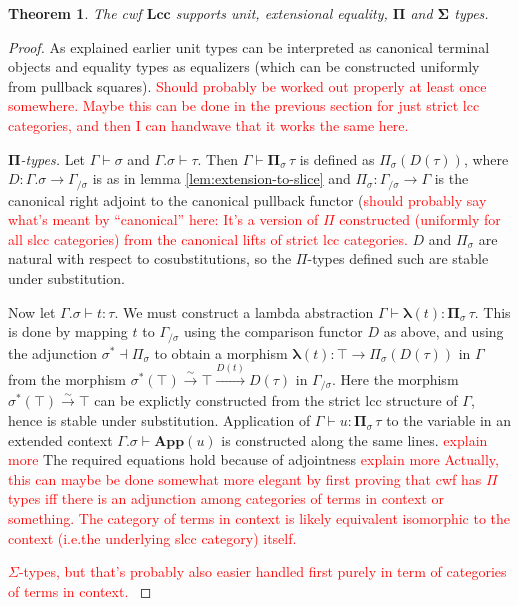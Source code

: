\documentclass{article}
\newcommand{\todo}[1]{\textcolor{red}{#1}}
\newtheorem{theorem}{Theorem}
\begin{document}
\begin{theorem}
  \label{th:lcc-supports-types}
  The cwf $\mathbf{Lcc}$ supports unit, extensional equality, $\mathbf{\Pi}$ and $\mathbf{\Sigma}$ types.
\end{theorem}
\begin{proof}
  As explained earlier unit types can be interpreted as canonical terminal objects and equality types as equalizers (which can be constructed uniformly from pullback squares).
  \todo{
    Should probably be worked out properly at least once somewhere.
    Maybe this can be done in the previous section for just strict lcc categories, and then I can handwave that it works the same here.
  }

  \emph{$\mathbf{\Pi}$-types.}
  Let $\Gamma \vdash \sigma$ and $\Gamma.\sigma \vdash \tau$.
  Then $\Gamma \vdash \mathbf{\Pi}_\sigma \, \tau$ is defined as $\Pi_\sigma(D(\tau))$, where $D : \Gamma.\sigma \rightarrow \Gamma_{/ \sigma}$ is as in lemma \ref{lem:extension-to-slice} and $\Pi_\sigma : \Gamma_{/ \sigma} \rightarrow \Gamma$ is the canonical right adjoint to the canonical pullback functor (\todo{should probably say what's meant by ``canonical'' here: It's a version of $\Pi$ constructed (uniformly for all slcc categories) from the canonical lifts of strict lcc categories.}
  $D$ and $\Pi_\sigma$ are natural with respect to cosubstitutions, so the $\Pi$-types defined such are stable under substitution.

  Now let $\Gamma.\sigma \vdash t : \tau$.
  We must construct a lambda abstraction $\Gamma \vdash \mathbf{\lambda}(t) : \mathbf{\Pi}_\sigma \, \tau$.
  This is done by mapping $t$ to $\Gamma_{/ \sigma}$ using the comparison functor $D$ as above, and using the adjunction $\sigma^* \dashv \Pi_\sigma$ to obtain a morphism $\mathbf{\lambda}(t) : \top \rightarrow \Pi_\sigma(D(\tau))$ in $\Gamma$ from the morphism $\sigma^*(\top) \xrightarrow{\sim} \top \xrightarrow{D(t)} D(\tau)$ in $\Gamma_{/ \sigma}$.
  Here the morphism $\sigma^*(\top) \xrightarrow{\sim} \top$ can be explictly constructed from the strict lcc structure of $\Gamma$, hence is stable under substitution.
  Application of $\Gamma \vdash u : \mathbf{\Pi}_\sigma \, \tau$ to the variable in an extended context $\Gamma.\sigma \vdash \mathbf{App}(u)$ is constructed along the same lines. \todo{explain more}
  The required equations hold because of adjointness \todo{explain more}
  \todo{
    Actually, this can maybe be done somewhat more elegant by first proving that cwf has $\Pi$ types iff there is an adjunction among categories of terms in context or something.
    The category of terms in context is likely equivalent isomorphic to the context (i.e.\@ the underlying slcc category) itself.
  }

  \todo{
    $\Sigma$-types, but that's probably also easier handled first purely in term of categories of terms in context.
  }
\end{proof}
\end{document}
